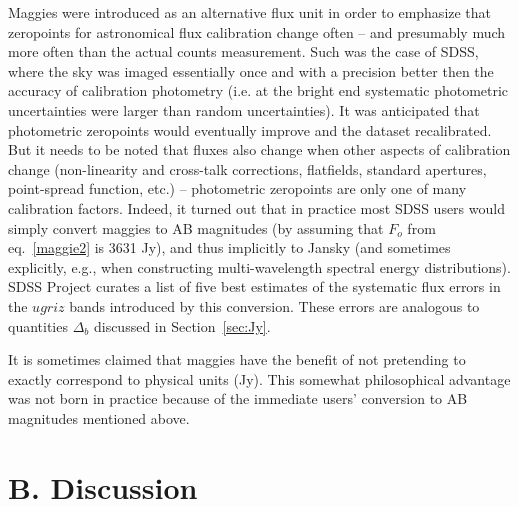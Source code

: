 \documentclass{emulateapj}
\begin{document}
Maggies were introduced as an alternative flux unit in order to emphasize
that zeropoints for astronomical flux calibration change often -- and 
presumably much more often than the actual counts measurement. Such 
was the case of SDSS, where the sky was imaged essentially once and with
a precision better then the accuracy of calibration photometry (i.e. at 
the bright end systematic photometric uncertainties were larger than 
random uncertainties). It was anticipated that photometric zeropoints 
would eventually improve and the dataset recalibrated.  But it needs to 
be noted that fluxes also change when other aspects of calibration change
(non-linearity and cross-talk corrections, flatfields, standard apertures, 
point-spread function, etc.) -- photometric zeropoints are only one of 
many calibration factors. Indeed, it turned out that in practice most 
SDSS users would simply convert maggies to AB magnitudes (by assuming
that $F_o$ from eq.~\ref{maggie2} is 3631 Jy), and thus
implicitly to Jansky (and sometimes explicitly, e.g., when constructing
multi-wavelength spectral energy distributions). SDSS Project curates a 
list of five best estimates of the systematic flux errors in the $ugriz$ 
bands introduced by this conversion. These errors are analogous to 
quantities $\Delta_b$ discussed in Section~\ref{sec:Jy}. 
 
It is sometimes claimed that maggies have the benefit of not pretending 
to exactly correspond to physical units (Jy). This somewhat philosophical
advantage was not born in practice because of the immediate users' 
conversion to AB magnitudes mentioned above. 


\section{B. Discussion} 
\end{document}
